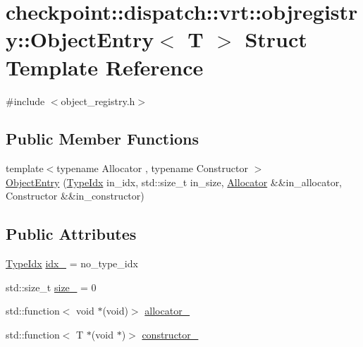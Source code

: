 \hypertarget{structcheckpoint_1_1dispatch_1_1vrt_1_1objregistry_1_1_object_entry}{}\section{checkpoint\+:\+:dispatch\+:\+:vrt\+:\+:objregistry\+:\+:Object\+Entry$<$ T $>$ Struct Template Reference}
\label{structcheckpoint_1_1dispatch_1_1vrt_1_1objregistry_1_1_object_entry}


{\ttfamily \#include $<$object\+\_\+registry.\+h$>$}

\subsection*{Public Member Functions}
\begin{DoxyCompactItemize}
\item 
{\footnotesize template$<$typename Allocator , typename Constructor $>$ }\\\hyperlink{structcheckpoint_1_1dispatch_1_1vrt_1_1objregistry_1_1_object_entry_a735350e927d76cbb9d0478fed399b0ca}{Object\+Entry} (\hyperlink{namespacecheckpoint_1_1dispatch_1_1vrt_acd3f9e6b091bcfbc23dc35ea8ef45d3b}{Type\+Idx} in\+\_\+idx, std\+::size\+\_\+t in\+\_\+size, \hyperlink{structcheckpoint_1_1dispatch_1_1_allocator}{Allocator} \&\&in\+\_\+allocator, Constructor \&\&in\+\_\+constructor)
\end{DoxyCompactItemize}
\subsection*{Public Attributes}
\begin{DoxyCompactItemize}
\item 
\hyperlink{namespacecheckpoint_1_1dispatch_1_1vrt_acd3f9e6b091bcfbc23dc35ea8ef45d3b}{Type\+Idx} \hyperlink{structcheckpoint_1_1dispatch_1_1vrt_1_1objregistry_1_1_object_entry_a95864cbf2656db8f3d003f1d7d59ad0e}{idx\+\_\+} = no\+\_\+type\+\_\+idx
\item 
std\+::size\+\_\+t \hyperlink{structcheckpoint_1_1dispatch_1_1vrt_1_1objregistry_1_1_object_entry_a4395eb53a4569f96fde3dcf4e9b2ad02}{size\+\_\+} = 0
\item 
std\+::function$<$ void $\ast$(void)$>$ \hyperlink{structcheckpoint_1_1dispatch_1_1vrt_1_1objregistry_1_1_object_entry_a90e91c26c97dc9ea779e42e6c634d456}{allocator\+\_\+}
\item 
std\+::function$<$ T $\ast$(void $\ast$)$>$ \hyperlink{structcheckpoint_1_1dispatch_1_1vrt_1_1objregistry_1_1_object_entry_a2280096c968c25eec0f9d641ece38d23}{constructor\+\_\+}
\end{DoxyCompactItemize}


